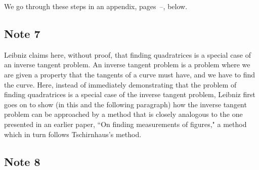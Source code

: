 \documentclass[twoside,openright]{article}
\begin{document}
We go through these steps in an appendix, pages~\pageref{begapp}--\pageref{endapp}, below.

\subsection*{Note 7}
\label{crg7}

Leibniz claims here, without proof, that finding quadratrices is a
special case of an inverse tangent problem. An inverse tangent problem
is a problem where we are given a property that the tangents of a
curve must have, and we have to find the curve.  Here, instead of
immediately demonstrating that the problem of finding quadratrices is
a special case of the inverse tangent problem, Leibniz first goes on
to show (in this and the following paragraph) how the inverse tangent
problem can be approached by a method that is closely analogous to the
one presented in an earlier paper, ``On finding measurements of
figures," a method which in turn follows Tschirnhaus's method.

\subsection*{Note 8}
\label{crg8}
\end{document}
